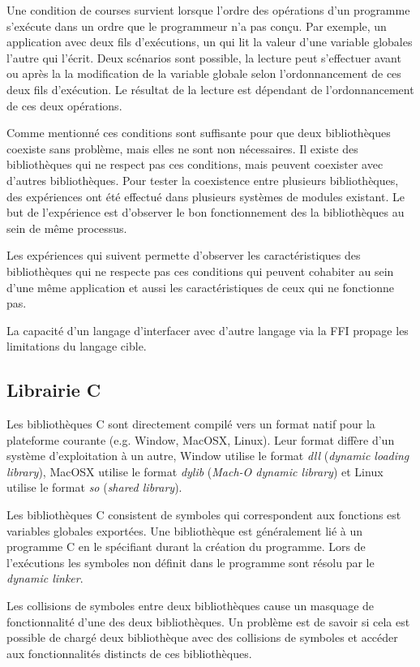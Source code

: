 \documentclass[12pt,initial,twoside,maitrise]{dms}
\numberwithin{equation}{section}
\numberwithin{table}{chapter}
\numberwithin{figure}{chapter}
\begin{document}
Une condition de courses
survient lorsque l'ordre des opérations d'un programme s'exécute dans un ordre
que le programmeur n'a pas conçu. Par exemple, un application avec deux fils
d'exécutions, un qui lit la valeur d'une variable globales l'autre qui l'écrit.
Deux scénarios sont possible, la lecture peut s'effectuer avant ou après la la
modification de la variable globale selon l'ordonnancement de ces deux fils d'exécution.
Le résultat de la lecture est dépendant de l'ordonnancement de ces deux opérations.

Comme mentionné ces conditions sont suffisante pour que deux bibliothèques coexiste sans problème,
mais elles ne sont non nécessaires. Il existe des bibliothèques
qui ne respect pas ces conditions, mais peuvent coexister avec d'autres
bibliothèques. Pour tester la coexistence entre plusieurs bibliothèques,
des expériences ont été effectué dans plusieurs systèmes de modules
existant. Le but de l'expérience est d'observer le bon fonctionnement
des la bibliothèques au sein de même processus.

Les expériences qui suivent permette d'observer
les caractéristiques des bibliothèques qui ne respecte pas ces conditions
qui peuvent cohabiter au sein d'une même application et aussi les
caractéristiques de ceux qui ne fonctionne pas.

La capacité d'un langage d'interfacer avec d'autre langage via la FFI propage
les limitations du langage cible.


\subsection{Librairie C}
Les bibliothèques C sont directement compilé vers un format natif pour la plateforme courante
(e.g. Window, MacOSX, Linux). Leur format diffère d'un système d'exploitation à un autre, Window utilise le format \textit{dll}
(\textit{dynamic loading library}), MacOSX utilise le format \textit{dylib} (\textit{Mach-O dynamic library})
et Linux utilise le format \textit{so} (\textit{shared library}).

Les bibliothèques C consistent de symboles qui correspondent aux fonctions est variables
globales exportées. Une bibliothèque est généralement lié à un programme C en le spécifiant
durant la création du programme. Lors de l'exécutions les symboles non définit dans le programme
sont résolu par le \textit{dynamic linker}.

Les collisions de symboles entre deux bibliothèques cause un masquage de
fonctionnalité d'une des deux bibliothèques. Un problème est de savoir si cela est
possible de chargé deux bibliothèque avec des collisions de symboles et accéder aux
fonctionnalités distincts de ces bibliothèques.
\end{document}
